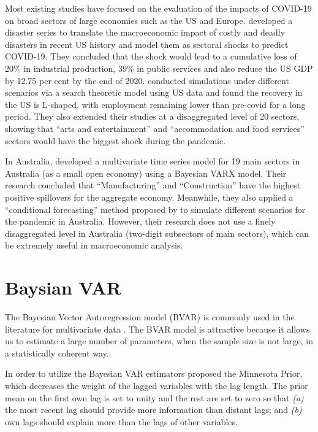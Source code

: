 \documentclass{monashthesis}
\begin{document}
Most existing studies have focused on the evaluation of the impacts of COVID-19 on broad sectors of large economies such as the US and Europe. \textcite{ludvigson2020covid} developed a disaster series to translate the macroeconomic impact of costly and deadly disasters in recent US history and model them as sectoral shocks to predict COVID-19. They concluded that the shock would lead to a cumulative loss of 20\% in industrial production, 39\% in public services and also reduce the US GDP by 12.75 per cent by the end of 2020. \textcite{gregory2020pandemic} conducted simulations under different scenarios via a search theoretic model using US data and found the recovery in the US is L-shaped, with employment remaining lower than pre-covid for a long period. They also extended their studies at a disaggregated level of 20 sectors, showing that ``arts and entertainment'' and ``accommodation and food services'' sectors would have the biggest shock during the pandemic.

In Australia, \textcite{anderson2020} developed a multivariate time series model for 19 main sectors in Australia (as a small open economy) using a Bayesian VARX model. Their research concluded that ``Manufacturing'' and ``Construction'' have the highest positive spillovers for the aggregate economy. Meanwhile, they also applied a ``conditional forecasting'' method proposed by \textcite{waggoner1999} to simulate different scenarios for the pandemic in Australia. However, their research does not use a finely disaggregated level in Australia (two-digit subsectors of main sectors), which can be extremely useful in macroeconomic analysis.

\hypertarget{baysian-var}{%
\section{Baysian VAR}\label{baysian-var}}

The Bayesian Vector Autoregression model (BVAR) is commonly used in the literature for multivariate data \autocites[e.g.][]{anderson2020,litterman1986,banbura2010large}. The BVAR model is attractive because it allows us to estimate a large number of parameters, when the sample size is not large, in a statistically coherent way.\autocite{litterman1986,wozniak2016bayesian}.

In order to utilize the Bayesian VAR estimators \textcite{litterman1979} proposed the Minnesota Prior, which decreases the weight of the lagged variables with the lag length. The prior mean on the first own lag is set to unity and the rest are set to zero so that \emph{(a)} the most recent lag should provide more information than distant lags; and \emph{(b)} own lags should explain more than the lags of other variables.
\end{document}
